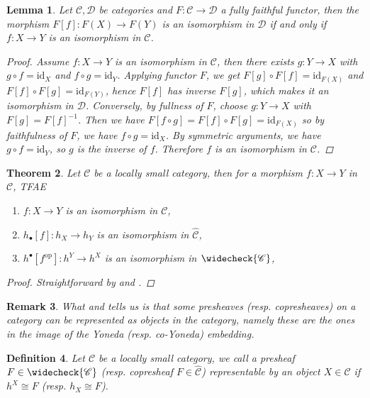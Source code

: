 \documentclass[10pt]{book}
\theoremstyle{bookplain}
\newtheorem{theorem}{Theorem}[section]
\newtheorem{lemma}[theorem]{Lemma}
\theoremstyle{bookdefinition}
\newtheorem{definition}[theorem]{Definition}
\theoremstyle{bookremark}
\newtheorem{remark}[theorem]{Remark}
\begin{document}
\begin{lemma}\label{lem:isom}Let $\mathscr{C},\mathscr{D}$ be categories and $F:\mathscr{C}\rightarrow\mathscr{D}$ a fully faithful functor, then the morphism  $F[f]:F(X)\rightarrow F(Y)$ is an isomorphism in $\mathscr{D}$ if and only if $f:X\rightarrow Y$ is an isomorphism in $\mathscr{C}$. 
    \begin{proof}
    Assume $f:X\rightarrow Y$ is an isomorphism in $\mathscr{C}$, then there exists $g:Y\rightarrow X$ with $g\circ f=\mathrm{id}_X$ and $f\circ g=\mathrm{id}_Y$.
    Applying functor $F$, we get $F[g]\circ F[f]=\mathrm{id}_{F(X)}$ and $F[f]\circ F[g]=\mathrm{id}_{F(Y)}$, hence $F[f]$ has inverse $F[g]$, which makes it an isomorphism in $\mathscr{D}$.
    Conversely, by fullness of $F$, choose $g:Y\rightarrow X$ with $F[g]=F[f]^{-1}$. Then we have $F[f\circ g]=F[f]\circ F[g]=\mathrm{id}_{F(X)}$ so by faithfulness of $F$, we have $f\circ g=\mathrm{id}_X$. By symmetric arguments, we have $g\circ f=\mathrm{id}_Y$, so $g$ is the inverse of $f$.  
    Therefore $f$ is an isomorphism in $\mathscr{C}$. 
    \end{proof}
\end{lemma}
\begin{theorem}
    \label{thm:yon}
    Let $\mathscr{C}$ be a locally small category, then for a morphism $f:X\rightarrow Y$ in $\mathscr{C}$, TFAE
    \begin{enumerate}
        \item $f:X\rightarrow Y$ is an isomorphism in $\mathscr{C}$,
        \item $h_\bullet[f]:h_X\rightarrow h_Y$ is an isomorphism in $\widehat{\mathscr{C}}$,
        \item $h^\bullet[f^{\mathrm{op}}]:h^Y\rightarrow h^X$ is an isomorphism in $\widecheck{\mathscr{C}}$,
    \end{enumerate}
    \begin{proof}
        Straightforward by  and . 
    \end{proof}
\end{theorem}

\begin{remark}What  and  tells us is that some presheaves (resp. copresheaves) on a category can be represented as objects in the category, namely these are the ones in the image of the Yoneda (resp. co-Yoneda) embedding. 
\end{remark}
\begin{definition}Let $\mathscr{C}$ be a locally small category, we call a presheaf $F\in \widecheck{\mathscr{C}}$ (resp. copresheaf $F\in \widehat{\mathscr{C}}$) \textit{representable} by an object $X\in\mathscr{C}$ if $h^X\cong F$ (resp. $h_X\cong F$). 
\end{definition}
\end{document}
